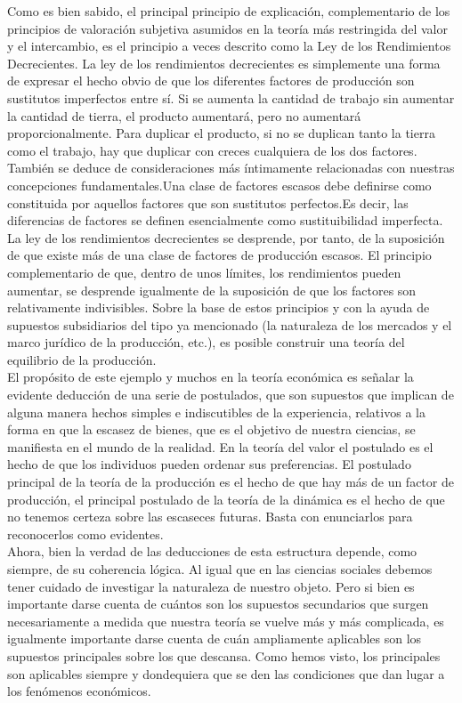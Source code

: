  Como es bien sabido, el principal principio de explicación, complementario de los principios de valoración subjetiva asumidos en la teoría más restringida del valor y el intercambio, es el principio a veces descrito como la Ley de los Rendimientos Decrecientes. La ley de los rendimientos decrecientes es simplemente una forma de expresar el hecho obvio de que los diferentes factores de producción son sustitutos imperfectos entre sí. Si se aumenta la cantidad de trabajo sin aumentar la cantidad de tierra, el producto aumentará, pero no aumentará proporcionalmente. Para duplicar el producto, si no se duplican tanto la tierra como el trabajo, hay que duplicar con creces cualquiera de los dos factores. También se deduce de consideraciones más íntimamente relacionadas con nuestras concepciones fundamentales.Una clase de factores escasos debe definirse como constituida por aquellos factores que son sustitutos perfectos.Es decir, las diferencias de factores se definen esencialmente como sustituibilidad imperfecta. La ley de los rendimientos decrecientes se desprende, por tanto, de la suposición de que existe más de una clase de factores de producción escasos. El principio complementario de que, dentro de unos límites, los rendimientos pueden aumentar, se desprende igualmente de la suposición de que los factores son relativamente indivisibles. Sobre la base de estos principios y con la ayuda de supuestos subsidiarios del tipo ya mencionado (la naturaleza de los mercados y el marco jurídico de la producción, etc.), es posible construir una teoría del equilibrio de la producción.\\

 El propósito de este ejemplo y muchos en la teoría económica es señalar la evidente deducción de una serie de postulados, que son supuestos que implican de alguna manera hechos simples e indiscutibles de la experiencia, relativos a la forma en que la escasez de bienes, que es el objetivo de nuestra ciencias, se manifiesta en el mundo de la realidad. En la teoría del valor el postulado es el hecho de que los individuos pueden ordenar sus preferencias. El postulado principal de la teoría de la producción es el hecho de que hay más de un factor de producción, el principal postulado de la teoría de la dinámica es el hecho de que no tenemos certeza sobre las escaseces futuras. Basta con enunciarlos para reconocerlos como evidentes.\\

 Ahora, bien la verdad de las deducciones de esta estructura depende, como siempre, de su coherencia lógica. Al igual que en las ciencias sociales debemos tener cuidado de investigar la naturaleza de nuestro objeto. Pero si bien es importante darse cuenta de cuántos son los supuestos secundarios que surgen necesariamente a medida que nuestra teoría se vuelve más y más complicada, es igualmente importante darse cuenta de cuán ampliamente aplicables son los supuestos principales sobre los que descansa. Como hemos visto, los principales son aplicables siempre y dondequiera que se den las condiciones que dan lugar a los fenómenos económicos. \\

